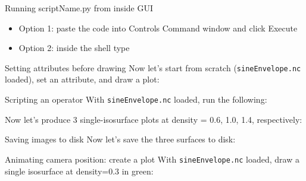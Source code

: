 \begin{frame}{Running scriptName.py from inside GUI}
  \begin{itemize}\setlength{\itemsep}{3mm}
  \item Option 1: paste the code into Controls \ra Command window and click Execute
  \item Option 2: inside the shell type \runScript
  \end{itemize}
\end{frame}

\begin{frame}{Setting attributes before drawing}
  Now let's start from scratch (\texttt{sineEnvelope.nc} loaded), set an attribute, and draw a plot:
  
\end{frame}

\begin{frame}{Scripting an operator}
  With \texttt{sineEnvelope.nc} loaded, run the following:
  
  \pause\bigskip
  {\small Now let's produce 3 single-isosurface plots at density = 0.6, 1.0, 1.4, respectively:}
  
\end{frame}


\begin{frame}{Saving images to disk}
  \writeToDisk\pause
  Now let's save the three surfaces to disk:
  
\end{frame}

\begin{frame}{Animating camera position: create a plot}
  With \texttt{sineEnvelope.nc} loaded, draw a single isosurface at density=0.3 in green:
  
    \pause
  
\end{frame}

